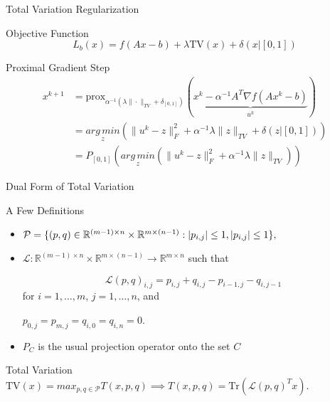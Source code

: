 \documentclass[12pt]{beamer}
\DeclarePairedDelimiter{\abs}{\lvert}{\rvert}
\newcommand{\R}{\mathbb{R}}
\newcommand{\AMz}{\underset{z}{arg\, min}}
\newcommand{\prox}{\text{prox}}
\begin{document}
\begin{frame}{Total Variation Regularization}

\begin{exampleblock}{Objective Function}
$$
L_b(x) = f(Ax-b) + \lambda \mathrm{TV}(x) + \delta(x | [0,1])
$$
\end{exampleblock}

\begin{exampleblock}{Proximal Gradient Step}
\begin{align*}
x^{k+1} &= \prox_{\alpha^{-1}(\lambda \|\cdot \|_{TV} + \delta_{[0,1]})} (\underbrace{x^k - \alpha^{-1} A^T\nabla f (Ax^k - b)}_{u^k}) \\
&= \AMz \left( \|u^k - z\|_F^2 + \alpha^{-1}\lambda \|z\|_{TV} + \delta(z | [0,1]) \right) \\
&= P_{[0,1]}  \left( \AMz \left( \|u^k - z\|_F^2 + \alpha^{-1}\lambda \|z\|_{TV} \right) \right)
\end{align*}
\end{exampleblock}

\end{frame}

\begin{frame}{Dual Form of Total Variation}

\begin{exampleblock}{A Few Definitions}
\begin{itemize}

\item $\mathcal{P} = \{ (p,q) \in \R^{(m-1) \times n} \times \R^{ m \times (n-1) } :  \abs{p_{i,j} } \le 1, \abs{p_{ i,j } } \le 1 \},$

\item $ \mathcal{L} : \R^{(m-1) \times n} \times \R^{ m \times (n-1) } \rightarrow \R^{m \times n}$ such that

$$ \mathcal{L}(p,q)_{i,j} = p_{i,j} + q_{i,j} - p_{ i-1,j } - q_{ i,j-1 }$$ for $i = 1,\dots,m$, $j = 1,\dots,n$, and 

$ p_{0,j} = p_{m,j} = q_{i,0} = q_{i,n} = 0.$ 

\item $P_C$ is the usual projection operator onto the set $C$

\end{itemize}
\end{exampleblock}

\begin{exampleblock}{Total Variation}
$ \mathrm{TV}(x) = max_{p,q \in \mathcal{P}} T(x, p,q) \implies T(x,p,q) = \mathrm{Tr} ( \mathcal{L}(p,q)^T x ).$
\end{exampleblock}

\end{frame}
\end{document}
